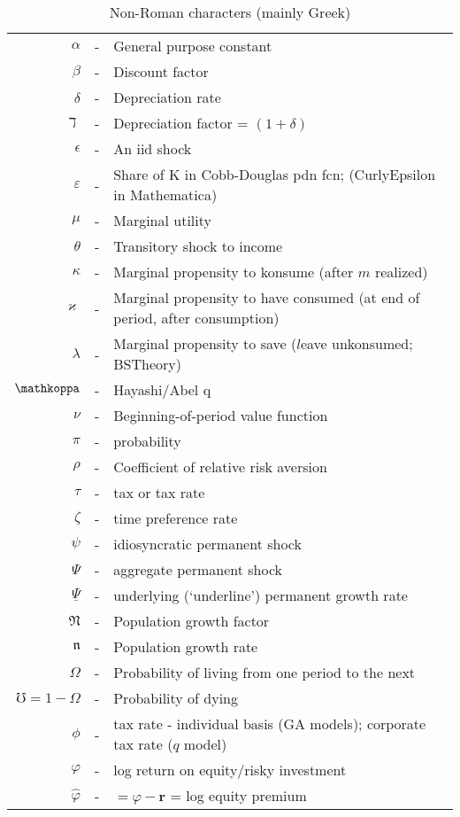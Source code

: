 \documentclass{article}
\begin{document}
\begin{table}
\caption{Non-Roman characters (mainly Greek)}
\begin{tabular}{rcl}
    $\alpha$   & - & General purpose constant
\\  $\beta$   & - & Discount factor
\\  $\delta$  & - & Depreciation rate
\\  $\daleth$ & - & Depreciation factor = $(1+\delta)$
\\  $\epsilon$ & - & An iid shock
\\  $\varepsilon$ & - & Share of K in Cobb-Douglas pdn fcn; (CurlyEpsilon in Mathematica)
\\  $\mu$     & - & Marginal utility
\\  $\theta$  & - & Transitory shock to income
\\  $\kappa$  & - & Marginal propensity to konsume (after $m$ realized)
\\  $\varkappa$  & - & Marginal propensity to have consumed (at end of period, after consumption)
\\  $\lambda$ & - & Marginal propensity to save ($l$eave unkonsumed; BSTheory)
\\  $\mathkoppa$   & - & Hayashi/Abel q
\\  $\nu$     & - & Beginning-of-period value function
\\  $\pi$     & - & probability
\\  $\rho$    & - & Coefficient of relative risk aversion
\\  $\tau$    & - & tax or tax rate
\\  $\zeta$    & - & time preference rate
\\  $\psi$    & - & idiosyncratic permanent shock
\\  $\Psi$    & - & aggregate permanent shock
\\  $\underline{\Psi}$ & - & underlying (`underline') permanent growth rate
\\  $\mathfrak{N}$ & - & Population growth factor
\\  $\mathfrak{n}$ & - & Population growth rate
\\  $\Omega$   & - & Probability of living from one period to the next
\\  $\mho=1-\Omega$  & - & Probability of dying 
\\  $\phi$    & - & tax rate - individual basis (GA models); corporate tax rate ($q$ model)
\\  $\varphi$ & - & log return on equity/risky investment
\\  $\hat{\varphi}$ & - & $= \varphi - \mathbf{r}$ = log equity premium

\end{tabular}
\end{table}
\end{document}
